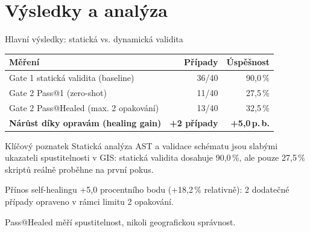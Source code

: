\documentclass[aspectratio=169,10pt]{beamer}
\begin{document}
\section{Výsledky a analýza}

\begin{frame}[t]{Hlavní výsledky: statická vs. dynamická validita}
  \small
  \begin{table}
    \centering
    \begin{tabular}{@{}lrr@{}}
      \toprule
      \textbf{Měření} & \textbf{Případy} & \textbf{Úspěšnost} \\
      \midrule
      Gate 1 statická validita (baseline) & 36/40 & 90,0\,\% \\
      Gate 2 Pass@1 (zero-shot) & 11/40 & 27,5\,\% \\
      Gate 2 Pass@Healed (max. 2 opakování) & 13/40 & 32,5\,\% \\
      \midrule
      \textbf{Nárůst díky opravám (healing gain)} & \textbf{+2 případy}
        & \textbf{+5,0\,p.\,b.} \\
      \bottomrule
    \end{tabular}
  \end{table}

  \begin{alertblock}{Klíčový poznatek}
    Statická analýza AST a validace schématu jsou slabými ukazateli
    spustitelnosti v GIS: statická validita dosahuje 90,0\,\%, ale pouze
    27,5\,\% skriptů reálně proběhne na první pokus.
  \end{alertblock}

  \begin{exampleblock}{Přínos self-healingu}
    +5,0 procentního bodu (+18,2\,\% relativně): 2 dodatečné případy opraveno
    v rámci limitu 2 opakování.
  \end{exampleblock}

  {\footnotesize Pass@Healed měří spustitelnost, nikoli geografickou správnost.}
\end{frame}
\end{document}
